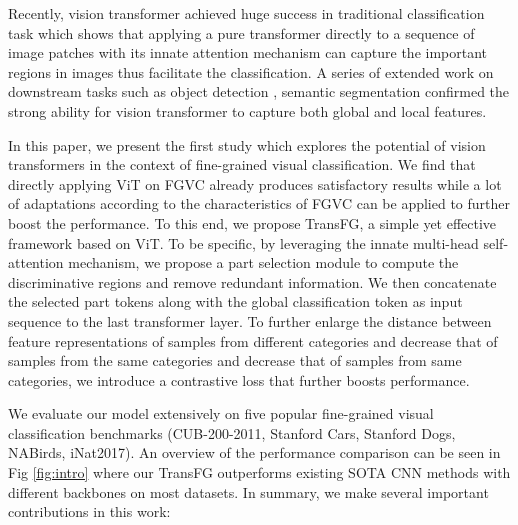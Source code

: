 \documentclass[10pt,twocolumn,letterpaper]{article}
\begin{document}
Recently, vision transformer \cite{dosovitskiy2020image} achieved huge success in traditional classification task which shows that applying a pure transformer directly to a sequence of image patches with its innate attention mechanism can capture the important regions in images thus facilitate the classification. A series of extended work on downstream tasks such as object detection \cite{carion2020end}, semantic segmentation \cite{zheng2020rethinking, xie2021trans2seg, chen2021transunet} confirmed the strong ability for vision transformer to capture both global and local features.

In this paper, we present the first study which explores the potential of vision transformers in the context of fine-grained visual classification. We find that directly applying ViT on FGVC already produces satisfactory results while a lot of adaptations according to the characteristics of FGVC can be applied to further boost the performance. To this end, we propose TransFG, a simple yet effective framework based on ViT. To be specific, by leveraging the innate multi-head self-attention mechanism, we propose a part selection module to compute the discriminative regions and remove redundant information. We then concatenate the selected part tokens along with the global classification token as input sequence to the last transformer layer. To further enlarge the distance between feature representations of samples from different categories and decrease that of samples from the same categories and decrease that of samples from same categories, we introduce a contrastive loss that further boosts performance.

We evaluate our model extensively on five popular fine-grained visual classification benchmarks (CUB-200-2011, Stanford Cars, Stanford Dogs, NABirds, iNat2017). An overview of the performance comparison can be seen in Fig \ref{fig:intro} where our TransFG outperforms existing SOTA CNN methods with different backbones on most datasets. In summary, we make several important contributions in this work:
\end{document}
